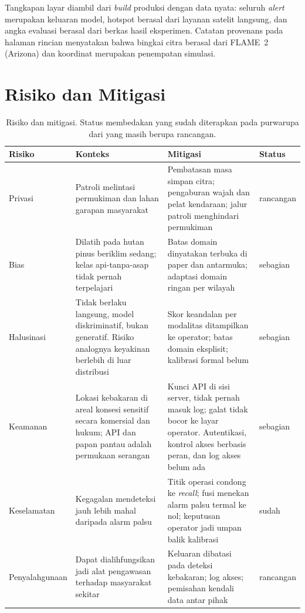 Tangkapan layar diambil dari \emph{build} produksi dengan data nyata: seluruh
\emph{alert} merupakan keluaran model, hotspot berasal dari layanan satelit
langsung, dan angka evaluasi berasal dari berkas hasil eksperimen. Catatan
provenans pada halaman rincian menyatakan bahwa bingkai citra berasal dari
FLAME~2 (Arizona) dan koordinat merupakan penempatan simulasi.

\section{Risiko dan Mitigasi}
\label{app:risiko}

\begin{table}[!htbp]
\caption{Risiko dan mitigasi. Status membedakan yang sudah diterapkan pada
purwarupa dari yang masih berupa rancangan.}
\label{tab:risiko}
\centering
\small
\begin{tabular}{p{1.7cm}p{4.6cm}p{4.4cm}p{1.4cm}}
\hline
\textbf{Risiko} & \textbf{Konteks} & \textbf{Mitigasi} & \textbf{Status} \\
\hline
Privasi & Patroli melintasi permukiman dan lahan garapan masyarakat &
Pembatasan masa simpan citra; pengaburan wajah dan pelat kendaraan; jalur
patroli menghindari permukiman & rancangan \\
Bias & Dilatih pada hutan pinus beriklim sedang; kelas api-tanpa-asap tidak
pernah terpelajari &
Batas domain dinyatakan terbuka di paper dan antarmuka; adaptasi domain ringan
per wilayah & sebagian \\
Halusinasi & Tidak berlaku langsung, model diskriminatif, bukan generatif.
Risiko analognya keyakinan berlebih di luar distribusi &
Skor keandalan per modalitas ditampilkan ke operator; batas domain eksplisit;
kalibrasi formal belum & sebagian \\
Keamanan & Lokasi kebakaran di areal konsesi sensitif secara komersial dan
hukum; API dan papan pantau adalah permukaan serangan &
Kunci API di sisi server, tidak pernah masuk log; galat tidak bocor ke layar
operator. Autentikasi, kontrol akses berbasis peran, dan log akses belum ada &
sebagian \\
Keselamatan & Kegagalan mendeteksi jauh lebih mahal daripada alarm palsu &
Titik operasi condong ke \emph{recall}; fusi menekan alarm palsu termal ke nol;
keputusan operator jadi umpan balik kalibrasi & sudah \\
Penyalah\-gunaan & Dapat dialihfungsikan jadi alat pengawasan terhadap
masyarakat sekitar &
Keluaran dibatasi pada deteksi kebakaran; log akses; pemisahan kendali data
antar pihak & rancangan \\
\hline
\end{tabular}
\end{table}


